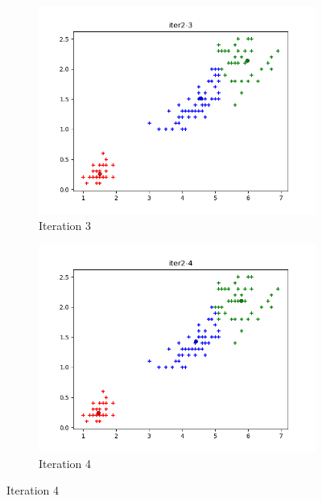 \documentclass[french]{article}
\begin{document}
\begin{figure}[h!]
\centering
\begin{subfigure}{.5\textwidth}
  \centering
  \includegraphics[width=\linewidth]{img/iter2-3.png}
  \caption{Iteration 3}
\end{subfigure}%
\begin{subfigure}{.5\textwidth}
  \centering
  \includegraphics[width=\linewidth]{img/iter2-4.png}
  \caption{Iteration 4}
\end{subfigure}%
\end{figure}
\end{document}
